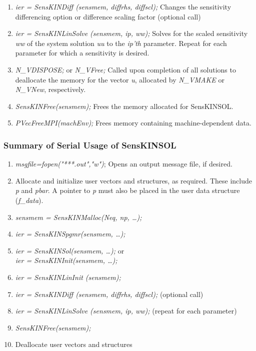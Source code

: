 \documentclass[11pt]{article}
\begin{document}
\begin{enumerate}
\item {\em ier = SensKINDiff (sensmem, diffrhs, diffscl);} Changes the
sensitivity differencing option or difference scaling factor (optional
call)

\item {\em ier = SensKINLinSolve (sensmem, ip, ww);} Solves for the
scaled sensitivity {\em ww} of the system solution {\em uu} to the
{\em ip'th} parameter. Repeat for each parameter for which a
sensitivity is desired.

\item {\em N\_VDISPOSE;} or {\em N\_VFree;} Called upon completion of
all solutions to deallocate the memory for the vector {\em u},
allocated by {\em N\_VMAKE} or {\em N\_VNew}, respectively.

\item {\em SensKINFree(sensmem);} Frees the memory allocated for
SensKINSOL.

\item {\em PVecFreeMPI(machEnv);} Frees memory containing
machine-dependent data.

\end{enumerate}

\subsubsection{Summary of Serial Usage of SensKINSOL} \label{serial-usage}

\begin{enumerate}

\item {\em msgfile=fopen("***.out","w")}; Opens an output message
file, if desired.

\item Allocate and initialize user vectors and structures, as required.
These include {\em p} and {\em pbar}. A pointer to {\em p} must
also be placed in the user data structure ({\em f\_data}).

\item {\em sensmem = SensKINMalloc(Neq, np, \ldots);}

\item {\em ier = SensKINSpgmr(sensmem, \ldots);}

\item {\em ier = SensKINSol(sensmem, \ldots);} or \\
      {\em ier = SensKINInit(sensmem, \ldots);}

\item {\em ier = SensKINLinInit (sensmem);}

\item {\em ier = SensKINDiff (sensmem, diffrhs, diffscl);} (optional
call)

\item {\em ier = SensKINLinSolve (sensmem, ip, ww);} (repeat for each parameter)

\item {\em SensKINFree(sensmem);}

\item Deallocate user vectors and structures

\end{enumerate}
\end{document}
